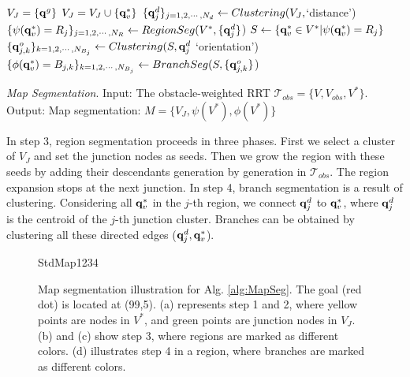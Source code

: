 \begin{algorithm}[h]
	\begin{algorithmic}[1]
		\STATE $V_{J}=\{{\bf q}^g\}$
		\STATE $V_J = V_J\cup \{{\bf q}^*_{v}\} $
		\ENDIF
		\ENDFOR	
		\STATE $\{{\bf q}^{d}_{j}\}_{j=1,2,\dotsm, N_d}\leftarrow Clustering(V_J,$`distance') 
		\STATE $\{\psi({\bf q}^*_v)=R_j\}_{j=1,2,\dotsm, N_R}\leftarrow RegionSeg(V^*, \{{\bf q}^{d}_{j}\}$)
		\STATE $S \leftarrow \{{\bf q}^*_v\in V^*|\psi({\bf q}^*_v) =R_j\}$
		\STATE $\{{\bf q}^{o}_{j,k}\}_{k=1,2,\dotsm, N_{B_j} } \leftarrow Clustering(S, {\bf q}^{d}_{j}$ `orientation') 
		\STATE $\{\phi({\bf q}^*_v)=B_{j,k}\}_{k=1,2,\dotsm, N_{B_j}}\leftarrow BranchSeg(S, \{{\bf q}^{o}_{j,k}\}$) 
		\ENDFOR
		
	\end{algorithmic}
	\caption{\textit {Map Segmentation}. Input: The obstacle-weighted RRT $\mathcal{T}_{obs} = \{V, V_{obs}, V^*\}$. Output: Map segmentation: $M = \{V_J, \psi(V^*), \phi(V^*)\}$  }
	\label{alg:MapSeg}
\end{algorithm}

In step 3, region segmentation proceeds in three phases. 
First we select a cluster of $V_J$ and set the junction nodes as seeds. 
Then we grow the region with these seeds by adding their descendants  generation by generation in $\mathcal{T}_{obs}$. 
The region expansion stops at the next junction. In step 4, branch segmentation is a result of clustering. 
Considering all ${\bf q}^*_v$ in the $j$-th region, we connect ${\bf q}^d_{j}$ to ${\bf q}^*_v$, where ${\bf q}^d_{j}$ is the centroid of the $j$-th junction cluster. 
Branches can be obtained by clustering all these directed edges (${\bf q}^d_{j}, {\bf q}^*_v$).              
    
\begin{figure}[h]
	\centering
	\begin{overpic}[width=0.9\columnwidth]{StdMap1234}
	\end{overpic}
	
	\caption{\label{fig:StdMap1234} Map segmentation illustration for Alg. \ref{alg:MapSeg}. The goal (red dot) is located at (99,5).  (a) represents step 1 and 2, where yellow points are nodes in $V^*$, and green points are junction nodes in $V_J$. (b) and (c) show step 3, where regions are marked as different colors. (d) illustrates step 4 in a region, where branches are marked as different colors. }
\end{figure}

